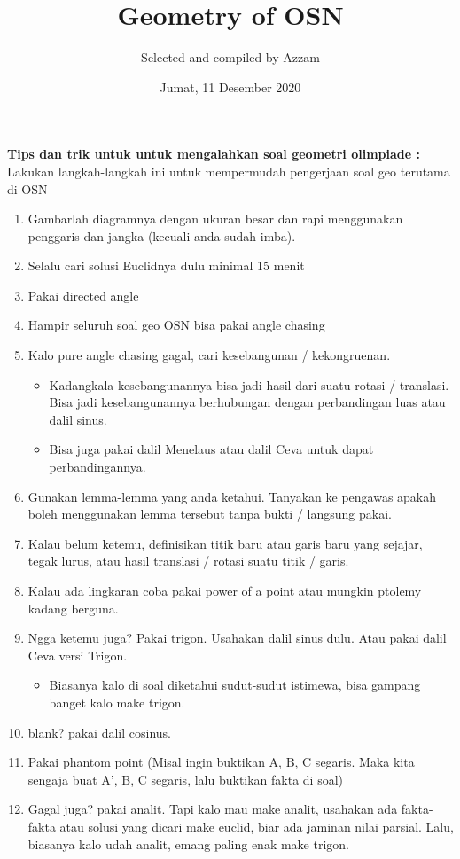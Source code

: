 \documentclass{article}[12pt]
\title{Geometry of OSN}
\author{Selected and compiled by Azzam}
\date{Jumat, 11 Desember 2020}
\begin{document}
	\maketitle
	\textbf{Tips dan trik untuk untuk mengalahkan soal geometri olimpiade :}
	\\Lakukan langkah-langkah ini untuk mempermudah pengerjaan soal geo terutama di OSN
	\begin{enumerate}
		\item
		Gambarlah diagramnya dengan ukuran besar dan rapi menggunakan penggaris dan jangka (kecuali anda sudah imba).
		\item
		Selalu cari solusi Euclidnya dulu minimal 15 menit
		\item
		Pakai directed angle
		\item
		Hampir seluruh soal geo OSN bisa pakai angle chasing
		\item
		Kalo pure angle chasing gagal, cari kesebangunan / kekongruenan. 
		\begin{itemize}
			\item
			Kadangkala kesebangunannya bisa jadi hasil dari suatu rotasi / translasi. Bisa jadi kesebangunannya berhubungan dengan perbandingan luas atau dalil sinus.
			\item
			Bisa juga pakai dalil Menelaus atau dalil Ceva untuk dapat perbandingannya.
		\end{itemize}
		\item
		Gunakan lemma-lemma yang anda ketahui. Tanyakan ke pengawas apakah boleh menggunakan lemma tersebut tanpa bukti / langsung pakai.
		\item
		Kalau belum ketemu, definisikan titik baru atau garis baru yang sejajar, tegak lurus, atau hasil translasi / rotasi suatu titik / garis.
		
		\item
		Kalau ada lingkaran coba pakai power of a point atau mungkin ptolemy kadang berguna.
		
		
		\item
		Ngga ketemu juga? Pakai trigon. Usahakan dalil sinus dulu. Atau pakai dalil Ceva versi Trigon.
		\begin{itemize}
			\item
			Biasanya kalo di soal diketahui sudut-sudut istimewa, bisa gampang banget kalo make trigon.
		\end{itemize}
		\item
		blank? pakai dalil cosinus.
		\item
		Pakai phantom point (Misal ingin buktikan A, B, C segaris. Maka kita sengaja buat A', B, C segaris, lalu buktikan fakta di soal)
		\item
		Gagal juga? pakai analit. Tapi kalo mau make analit, usahakan ada fakta-fakta atau solusi yang dicari make euclid, biar ada jaminan nilai parsial. Lalu, biasanya kalo udah analit, emang paling enak make trigon.
	
	\end{enumerate}
	
\end{document}
